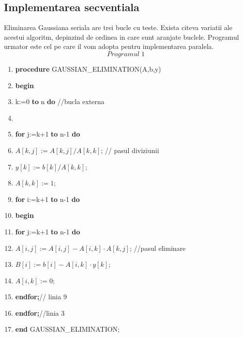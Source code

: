 \subsection{Implementarea secventiala}

\hspace{5mm}Eliminarea Gaussiana seriala are trei bucle cu teste. Exista
citeva variatii ale acestui algoritm, depinzind de ordinea in care sunt
aranjate buclele. Programul urmator este cel pe care il vom adopta pentru
implementarea paralela.
$$Programul\; 1$$
\label{program54}
\begin{enumerate}
\item {\bf procedure} GAUSSIAN\_ELIMINATION(A,b,y)
\item {\bf begin}
\item \hspace{5mm}{\bf for} k:=0 {\bf to} n {\bf do} //bucla externa
\item \hspace{5mm}{\bf begin}
\item \hspace{10mm} {\bf for} j:=k+1 {\bf to} n-1 {\bf do}
\item \hspace{15mm} $A[k,j]:=A[k,j]/A[k,k]$; // pasul diviziunii
\item \hspace{10mm} $y[k]:=b[k]/A[k,k]$;
\item \hspace{10mm} $A[k,k]:=1$;
\item \hspace{10mm} {\bf for} i:=k+1 {\bf to} n-1 {\bf do}
\item \hspace{10mm} {\bf begin}
\item \hspace{15mm} {\bf for} j:=k+1 {\bf to} n-1 {\bf do}
\item \hspace{20mm} $A[i,j]:=A[i,j]-A[i,k]\cdot A[k,j]$; //pasul eliminare
\item \hspace{15mm} $B[i]:=b[i]-A[i,k]\cdot y[k]$;
\item \hspace{15mm} $A[i,k]:=0$;
\item \hspace{10mm} {\bf endfor;}\hspace{10mm}// linia 9
\item \hspace{5mm} {\bf endfor;}\hspace{15mm}//linia 3
\item {\bf end} GAUSSIAN\_ELIMINATION;
\end{enumerate}

